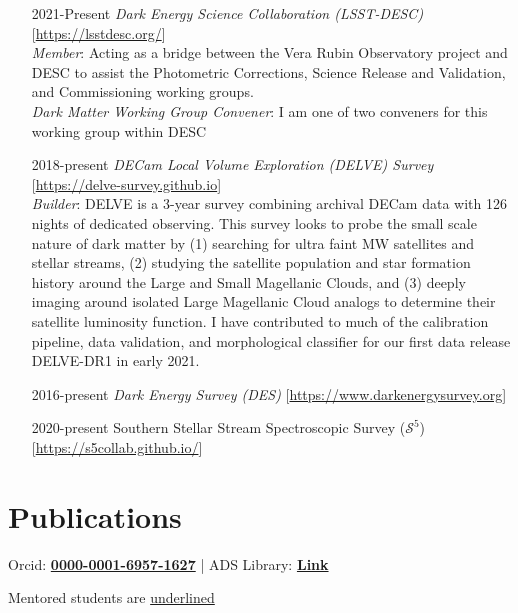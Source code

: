 \documentclass[11pt,letterpaper, sans]{moderncv}        %
\let\oldhref\href
\renewcommand{\href}[2]{\oldhref{#1}{\bfseries#2}}
\begin{document}
\begin{itemize}[itemsep=1pt, leftmargin=65pt]
\begin{itemize}
    \end{itemize}
    \item [2021-Present] \emph{Dark Energy Science Collaboration (LSST-DESC)} [\url{https://lsstdesc.org/}]\\
    \emph{Member}: Acting as a bridge between the Vera Rubin Observatory project and DESC to assist the Photometric Corrections, Science Release and Validation, and Commissioning working groups. \\
    \emph{Dark Matter Working Group Convener}: I am one of two conveners for this working group within DESC
    \item [2018-present] \emph{DECam Local Volume Exploration (DELVE) Survey} [\url{https://delve-survey.github.io}]\\
    \emph{Builder}: DELVE is a 3-year survey combining archival DECam data with 126 nights of dedicated observing. This survey looks to probe the small scale nature of dark matter by (1) searching for ultra faint MW satellites and stellar streams, (2) studying the satellite population and star formation history around the Large and Small Magellanic Clouds, and (3) deeply imaging around isolated Large Magellanic Cloud analogs to determine their satellite luminosity function. I have contributed to much of the calibration pipeline, data validation, and morphological classifier for our first data release DELVE-DR1 in early 2021. 
    
    \item [2016-present] \emph{Dark Energy Survey (DES)} [\url{https://www.darkenergysurvey.org}]\\
    \item [2020-present] Southern Stellar Stream Spectroscopic Survey ($\mathcal{S}^5$) [\url{https://s5collab.github.io/}]\\
\end{itemize}
\vspace*{-4mm}

\section{Publications}
\begin{center}
Orcid: \href{https://orcid.org/0000-0001-6957-1627}{0000-0001-6957-1627} | ADS Library: \href{https://ui.adsabs.harvard.edu/user/libraries/rBhHJF5MTWqIJuR0n-PNKA}{Link} 

Mentored students are \underline{underlined}
\end{center}
%

\newpage
\end{document}
